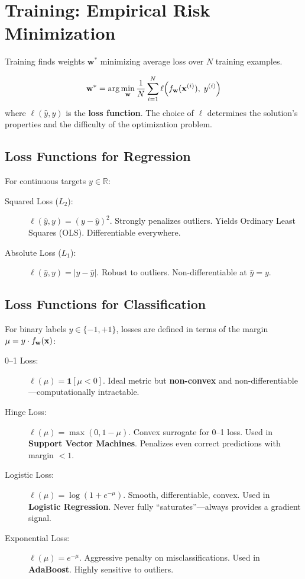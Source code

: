 \section*{Training: Empirical Risk Minimization}

Training finds weights $\mathbf{w}^*$ minimizing average loss over $N$ training examples.

\begin{definition}
$$\mathbf{w}^* = \arg\min_{\mathbf{w}} \frac{1}{N} \sum_{i=1}^{N} \ell\!\left(f_{\mathbf{w}}(\mathbf{x}^{(i)}),\; y^{(i)}\right)$$
where $\ell(\hat{y}, y)$ is the \textbf{loss function}. The choice of $\ell$ determines the solution's properties and the difficulty of the optimization problem.
\end{definition}

\subsection*{Loss Functions for Regression}

For continuous targets $y \in \mathbb{R}$:
\begin{description}
    \item[Squared Loss ($L_2$):] $\ell(\hat{y}, y) = (y - \hat{y})^2$. Strongly penalizes outliers. Yields Ordinary Least Squares (OLS). Differentiable everywhere.
    \item[Absolute Loss ($L_1$):] $\ell(\hat{y}, y) = |y - \hat{y}|$. Robust to outliers. Non-differentiable at $\hat{y} = y$.
\end{description}

\subsection*{Loss Functions for Classification}

For binary labels $y \in \{-1, +1\}$, losses are defined in terms of the margin $\mu = y \cdot f_{\mathbf{w}}(\mathbf{x})$:
\begin{description}
    \item[0--1 Loss:] $\ell(\mu) = \mathbf{1}[\mu < 0]$. Ideal metric but \textbf{non-convex} and non-differentiable---computationally intractable.
    \item[Hinge Loss:] $\ell(\mu) = \max(0, 1 - \mu)$. Convex surrogate for 0--1 loss. Used in \textbf{Support Vector Machines}. Penalizes even correct predictions with margin $< 1$.
    \item[Logistic Loss:] $\ell(\mu) = \log(1 + e^{-\mu})$. Smooth, differentiable, convex. Used in \textbf{Logistic Regression}. Never fully ``saturates''---always provides a gradient signal.
    \item[Exponential Loss:] $\ell(\mu) = e^{-\mu}$. Aggressive penalty on misclassifications. Used in \textbf{AdaBoost}. Highly sensitive to outliers.
\end{description}

